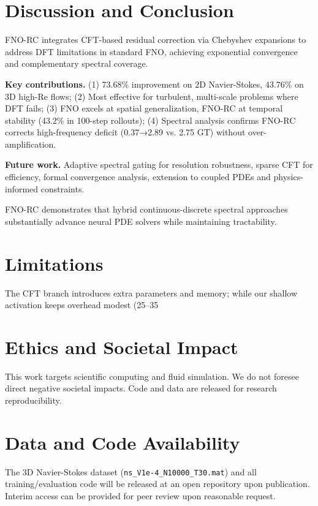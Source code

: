 \documentclass[11pt]{article}
\begin{document}
\section{Discussion and Conclusion}

FNO-RC integrates CFT-based residual correction via Chebyshev expansions to address DFT limitations in standard FNO, achieving exponential convergence and complementary spectral coverage.

\textbf{Key contributions.} (1) 73.68\% improvement on 2D Navier-Stokes, 43.76\% on 3D high-Re flows; (2) Most effective for turbulent, multi-scale problems where DFT fails; (3) FNO excels at spatial generalization, FNO-RC at temporal stability (43.2\% in 100-step rollouts); (4) Spectral analysis confirms FNO-RC corrects high-frequency deficit (0.37→2.89 vs. 2.75 GT) without over-amplification.

\textbf{Future work.} Adaptive spectral gating for resolution robustness, sparse CFT for efficiency, formal convergence analysis, extension to coupled PDEs and physics-informed constraints.

FNO-RC demonstrates that hybrid continuous-discrete spectral approaches substantially advance neural PDE solvers while maintaining tractability.

\section*{Limitations}
The CFT branch introduces extra parameters and memory; while our shallow activation keeps overhead modest (25–35%

\section*{Ethics and Societal Impact}
This work targets scientific computing and fluid simulation. We do not foresee direct negative societal impacts. Code and data are released for research reproducibility.

\section*{Data and Code Availability}
The 3D Navier-Stokes dataset (\texttt{ns\_V1e-4\_N10000\_T30.mat}) and all training/evaluation code will be released at an open repository upon publication. Interim access can be provided for peer review upon reasonable request.
\end{document}
